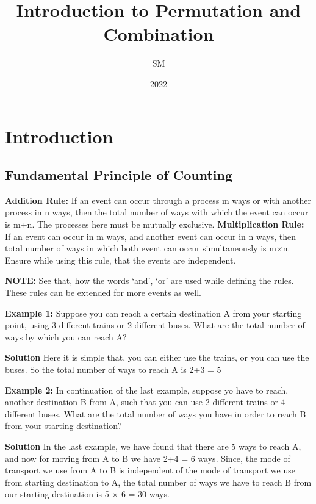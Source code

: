 \documentclass[12pt, a4paper]{article}
\title{Introduction to Permutation and Combination}
\author{SM}
\date{2022}
\begin{document}
\maketitle
\newpage
\tableofcontents
\newpage

\section{Introduction}
\subsection{Fundamental Principle of Counting}
\begin{tcolorbox}[colback=TealBlue!10!White,colframe=TealBlue!50!black]
\textbf{Addition Rule:} If an event can occur through a process m ways or with another process in n ways, then the total number of ways with which the event can occur is m+n. The processes here must be mutually exclusive.\newline
\textbf{Multiplication Rule:} If an event can occur in m ways, and another event can occur in n ways, then total number of ways in which both event can occur simultaneously is m×n. Ensure while using this rule, that the events are independent.
\end{tcolorbox}
\textbf{NOTE:} See that, how the words `and', `or' are used while defining the rules. These rules can be extended for more events as well.

\textbf{Example 1:} Suppose you can reach a certain destination A from your starting point, using 3 different trains or 2 different buses. What are the total number of ways by which you can reach A?

\textbf{Solution} Here it is simple that, you can either use the trains, or you can use the buses. So the total number of ways to reach A is 2+3 = 5

\textbf{Example 2:} In continuation of the last example, suppose yo have to reach, another destination B from A, such that you can use 2 different trains or 4 different buses. What are the total number of ways you have in order to reach B from your starting destination?

\textbf{Solution} In the last example, we have found that there are 5 ways to reach A, and now for moving from A to B we have 2+4 = 6 ways. Since, the mode of transport we use from A to B is independent of the mode of transport we use from starting destination to A, the total number of ways we have to reach B from our starting destination is 5 × 6 = 30 ways. \vspace{5mm}
\end{document}
